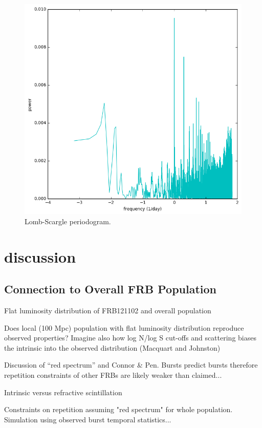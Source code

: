 \documentclass{emulateapj}
\begin{document}
\begin{figure}[htb]
\begin{center}
\includegraphics[width=0.9\columnwidth]{lombscargle}
\caption{Lomb-Scargle periodogram.
\label{fig:ls}}
\end{center}
\end{figure}



\section{discussion}

\subsection{Connection to Overall FRB Population}

Flat luminosity distribution of FRB121102 and overall population

Does local (100 Mpc) population with flat luminosity distribution reproduce observed properties? Imagine also how log N/log S cut-offs and scattering biases the intrinsic into the observed distribution (Macquart and Johnston)

Discussion of ``red spectrum'' and Connor \& Pen. Bursts predict bursts therefore repetition constraints of other FRBs are likely weaker than claimed...

Intrinsic versus refractive scintillation

Constraints on repetition assuming "red spectrum" for whole population. Simulation using observed burst temporal statistics...
\end{document}
